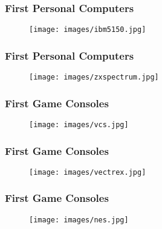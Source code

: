 \documentclass[aspectratio=43]{uva-inf-presentation}
\begin{document}

\begin{frame}
\frametitle{First Personal Computers}

\begin{figure}
\texttt{[image: images/ibm5150.jpg]}
\end{figure}

\end{frame}


\begin{frame}
\frametitle{First Personal Computers}

\begin{figure}
\texttt{[image: images/zxspectrum.jpg]}
\end{figure}

\end{frame}


\begin{frame}
\frametitle{First Game Consoles}

\begin{figure}
\texttt{[image: images/vcs.jpg]}
\end{figure}

\end{frame}


\begin{frame}
\frametitle{First Game Consoles}

\begin{figure}
\texttt{[image: images/vectrex.jpg]}
\end{figure}

\end{frame}


\begin{frame}
\frametitle{First Game Consoles}

\begin{figure}
\texttt{[image: images/nes.jpg]}
\end{figure}

\end{frame}

\end{document}
